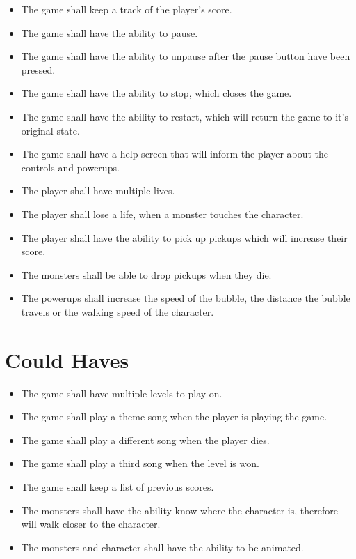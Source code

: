 \begin{itemize}
\itemsep0em 
	 \item The game shall keep a track of the player's score.
	 \item The game shall have the ability to pause.
	 \item The game shall have the ability to unpause after the pause button have been pressed.
	 \item The game shall have the ability to stop, which closes the game.
	 \item The game shall have the ability to restart, which will return the game to it's original state.
	 \item The game shall have a help screen that will inform the player about the controls and powerups.
	 \item The player shall have multiple lives.
	 \item The player shall lose a life, when a monster touches the character. 
	 \item The player shall have the ability to pick up pickups which will increase their score.
	 \item The monsters shall be able to drop pickups when they die.
	 \item The powerups shall increase the speed of the bubble, the distance the bubble travels or the walking speed of the character.
\end{itemize}

\section{Could Haves}

\begin{itemize}
\itemsep0em 
	  \item The game shall have multiple levels to play on.
	  \item The game shall play a theme song when the player is playing the game.
	  \item The game shall play a different song when the player dies.
	  \item The game shall play a third song when the level is won.
	  \item The game shall keep a list of previous scores.
	  \item The monsters shall have the ability know where the character is, therefore will walk closer to the character.
	  \item The monsters and character shall have the ability to be animated.
\end{itemize}

